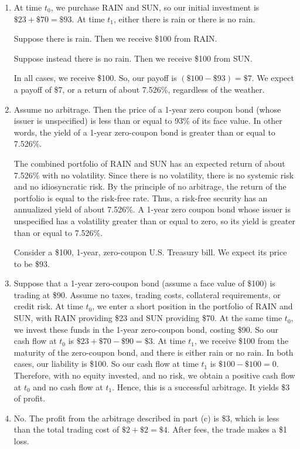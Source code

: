 \documentclass[12pt]{article}
\begin{document}
\begin{enumerate}
\item At time $t_0$, we purchase \textsc{RAIN} and \textsc{SUN}, so our initial investment is $\$23+\$70=\$93$. At time $t_1$, either there is rain or there is no rain.

Suppose there is rain. Then we receive \$100 from \textsc{RAIN}.

Suppose instead there is no rain. Then we receive \$100 from \textsc{SUN}.

In all cases, we receive \$100. So, our payoff is $(\$100-\$93)=\$7$. We expect a payoff of \$7, or a return of about 7.526\%, regardless of the weather.
\item Assume no arbitrage. Then the price of a 1-year zero coupon bond (whose issuer is unspecified) is less than or equal to 93\% of its face value. In other words, the yield of a 1-year zero-coupon bond is greater than or equal to 7.526\%.

The combined portfolio of \textsc{RAIN} and \textsc{SUN} has an expected return of about 7.526\% with no volatility. Since there is no volatility, there is no systemic risk and no idiosyncratic risk. By the principle of no arbitrage, the return of the portfolio is equal to the risk-free rate. Thus, a risk-free security has an annualized yield of about 7.526\%. A 1-year zero coupon bond whose issuer is unspecified has a volatility greater than or equal to zero, so its yield is greater than or equal to 7.526\%.

Consider a \$100, 1-year, zero-coupon U.S. Treasury bill. We expect its price to be \$93.
\item Suppose that a 1-year zero-coupon bond (assume a face value of \$100) is trading at \$90. Assume no taxes, trading costs, collateral requirements, or credit risk. At time $t_0$, we enter a short position in the portfolio of \textsc{RAIN} and \textsc{SUN}, with \textsc{RAIN} providing \$23 and \textsc{SUN} providing \$70. At the same time $t_0$, we invest these funds in the 1-year zero-coupon bond, costing \$90. So our cash flow at $t_0$ is $\$23+\$70-\$90=\$3$. At time $t_1$, we receive \$100 from the maturity of the zero-coupon bond, and there is either rain or no rain. In both cases, our liability is \$100. So our cash flow at time $t_1$ is $\$100-\$100=0$. Therefore, with no equity invested, and no risk, we obtain a positive cash flow at $t_0$ and no cash flow at $t_1$. Hence, this is a successful arbitrage. It yields \$3 of profit.
\item No. The profit from the arbitrage described in part (c) is \$3, which is less than the total trading cost of $\$2+\$2=\$4$. After fees, the trade makes a \$1 loss.
\end{enumerate}
\end{document}
